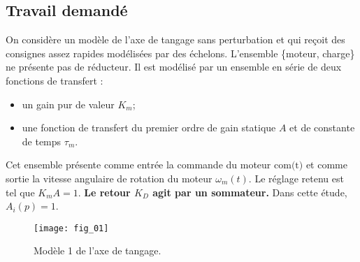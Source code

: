 \subsection*{Travail demandé}
\ifprof
\else
On considère un modèle de l’axe de tangage sans perturbation et qui reçoit des consignes assez rapides modélisées par
des échelons.
L’ensemble \{moteur, charge\} ne présente pas de réducteur. Il est modélisé par un ensemble en série de deux fonctions
de transfert :
\begin{itemize}
\item un gain pur de valeur $K_m$;%
\item une fonction de transfert du premier ordre de gain statique $A$ et de constante de temps $\tau_m$.
\end{itemize}
Cet ensemble présente comme entrée la commande du moteur $\text{com(t)}$ et comme sortie la vitesse angulaire de rotation
du moteur $\omega_m(t)$. Le réglage retenu est tel que $K_m A = 1$. \textbf{Le retour $K_D$ agit par un sommateur.}
Dans cette étude, $A_i(p)=1$.
\begin{figure}[H]
\texttt{[image: fig\_01]}

\caption{Modèle 1 de l’axe de tangage.}
\end{figure}

\fi

